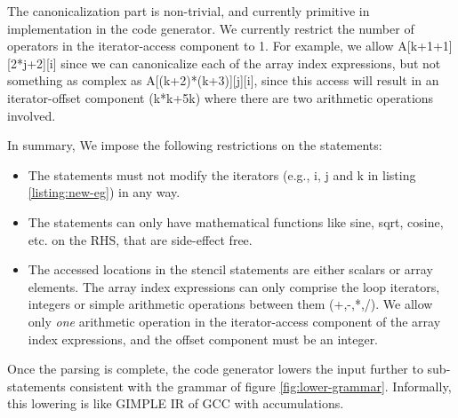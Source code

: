 The canonicalization part is non-trivial, and currently primitive in
implementation in the code generator. We currently restrict the number of
operators in the iterator-access component to 1. For example, we allow
A[k+1+1][2*j+2][i] since we can canonicalize each of the array index
expressions, but not something as complex as A[(k+2)*(k+3)][j][i], since this
access will result in an iterator-offset component (k*k+5k) where there are two
arithmetic operations involved.
 

In summary, We impose the following restrictions on the statements:
\begin{itemize}
\item The statements must not modify the iterators (e.g., i, j and k in listing
\ref{listing:new-eg}) in any way.  
\item The statements can only have mathematical functions like sine, sqrt,
cosine, etc. on the RHS, that are side-effect free.  
\item The accessed locations in the stencil statements are either scalars or
array elements. The array index expressions can only comprise the loop
iterators, integers or simple arithmetic operations between them (+,-,*,/).
We allow only \textit{one} arithmetic operation in the iterator-access component
of the array index expressions, and the offset component must be an integer.
\end{itemize} 

Once the parsing is complete, the code
generator lowers the input further to sub-statements consistent with the
grammar of figure \ref{fig:lower-grammar}. Informally, this lowering is like
GIMPLE IR of GCC \cite{gcc} with accumulations. 


